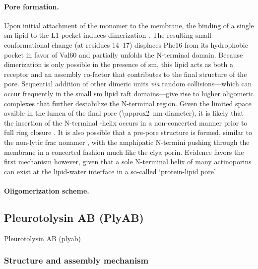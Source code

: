 \paragraph{Pore formation.}
%
Upon initial attachment of the monomer to the membrane, the binding of a single \gls{sm} lipid to the L1
pocket induces dimerization \cite{Tanaka-2015}. The resulting small conformational change (at residues 14--17)
displaces Phe16 from its hydrophobic pocket in favor of Val60 and partially unfolds the N-terminal domain.
Because dimerization is only possible in the presence of \gls{sm}, this lipid acts as both a receptor and an
assembly co-factor that contributes to the final structure of the pore. Sequential addition of other dimeric
units \textit{via} random collisions---which can occur frequently in the small \gls{sm} lipid raft
domains---give rise to higher oligomeric complexes that further destabilize the N-terminal region. Given the
limited space avaible in the lumen of the final pore (\SI{\approx2}{\nm} diameter), it is likely that the
insertion of the N-terminal \ta-helix occurs in a non-concerted manner prior to full ring closure
\cite{Cosentino-2016}. It is also possible that a pre-pore structure is formed, similar to the non-lytic
\gls{frac} nonamer \cite{Mechaly-2011}, with the amphipatic N-termini pushing through the membrane in a
concerted fashion \cite{Tanaka-2015,Rojko-2016} much like the \gls{clya} porin. Evidence favors the first
mechanism however, given that a sole N-terminal helix of many actinoporins can exist at the lipid-water
interface in a so-called `protein-lipid pore' \cite{Cosentino-2016}.


\paragraph{Oligomerization scheme.}
%

\subsection{Pleurotolysin AB (PlyAB)}

Pleurotolysin AB (\gls{plyab})

\subsubsection{Structure and assembly mechanism}

